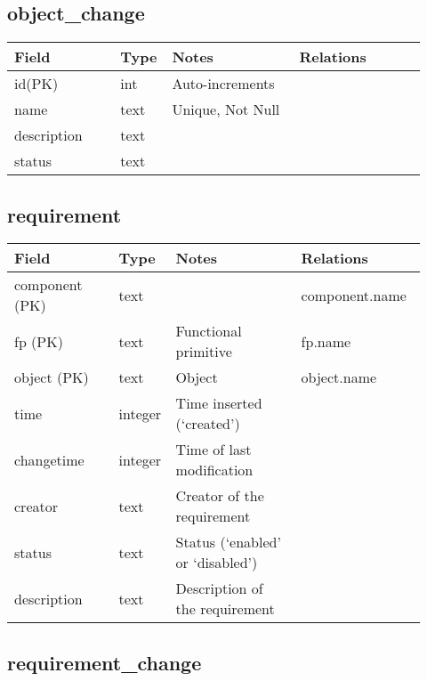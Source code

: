 \documentclass{article}
\begin{document}
\subsection{object\_change}

{\footnotesize
\begin{centering}
\begin{tabular}{p{0.25\linewidth}p{0.07\linewidth}p{0.3\linewidth}p{0.3\linewidth}}
\textbf{Field} & \textbf{Type} & \textbf{Notes} & \textbf{Relations} \\
\hline
id(PK) & int & Auto-increments&\\
\hline
name & text & Unique, Not Null &\\
\hline
description & text & & \\
\hline
status & text & & \\
\hline
\end{tabular}
\end{centering}
}




\subsection{requirement}

{\footnotesize
\begin{centering}
\begin{tabular}{p{0.25\linewidth}p{0.07\linewidth}p{0.3\linewidth}p{0.3\linewidth}}
\textbf{Field} & \textbf{Type} & \textbf{Notes} & \textbf{Relations} \\
\hline
component (PK) & text & & component.name \\
\hline
fp (PK) & text & Functional primitive & fp.name \\
\hline
object (PK) & text & Object & object.name \\
\hline
time & integer & Time inserted (`created') & \\
\hline
changetime & integer & Time of last modification & \\
\hline
creator & text & Creator of the requirement & \\
\hline
status & text & Status (`enabled' or `disabled') & \\
\hline
description & text & Description of the requirement & \\
\hline
\end{tabular}
\end{centering}
}


\subsection{requirement\_change}
\end{document}
